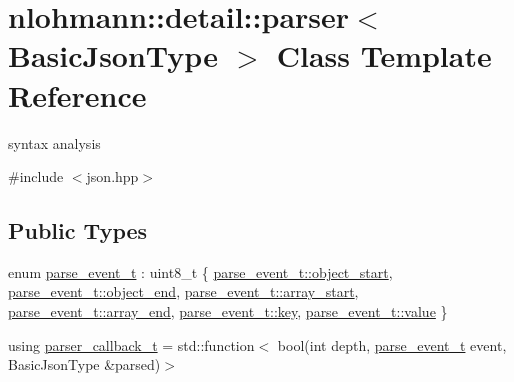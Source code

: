 \hypertarget{classnlohmann_1_1detail_1_1parser}{}\section{nlohmann\+::detail\+::parser$<$ Basic\+Json\+Type $>$ Class Template Reference}
\label{classnlohmann_1_1detail_1_1parser}


syntax analysis  




{\ttfamily \#include $<$json.\+hpp$>$}

\subsection*{Public Types}
\begin{DoxyCompactItemize}
\item 
enum \mbox{\hyperlink{classnlohmann_1_1detail_1_1parser_a37ac88c864dda495f72cb62776b0bebe}{parse\+\_\+event\+\_\+t}} \+: uint8\+\_\+t \{ \newline
\mbox{\hyperlink{classnlohmann_1_1detail_1_1parser_a37ac88c864dda495f72cb62776b0bebeae73f17027cb0acbb537f29d0a6944b26}{parse\+\_\+event\+\_\+t\+::object\+\_\+start}}, 
\mbox{\hyperlink{classnlohmann_1_1detail_1_1parser_a37ac88c864dda495f72cb62776b0bebeaf63e2a2468a37aa4f394fcc3bcb8249c}{parse\+\_\+event\+\_\+t\+::object\+\_\+end}}, 
\mbox{\hyperlink{classnlohmann_1_1detail_1_1parser_a37ac88c864dda495f72cb62776b0bebeaa4388a3d92419edbb1c6efd4d52461f3}{parse\+\_\+event\+\_\+t\+::array\+\_\+start}}, 
\mbox{\hyperlink{classnlohmann_1_1detail_1_1parser_a37ac88c864dda495f72cb62776b0bebea49642fb732aa2e112188fba1f9d3ef7f}{parse\+\_\+event\+\_\+t\+::array\+\_\+end}}, 
\newline
\mbox{\hyperlink{classnlohmann_1_1detail_1_1parser_a37ac88c864dda495f72cb62776b0bebea3c6e0b8a9c15224a8228b9a98ca1531d}{parse\+\_\+event\+\_\+t\+::key}}, 
\mbox{\hyperlink{classnlohmann_1_1detail_1_1parser_a37ac88c864dda495f72cb62776b0bebea2063c1608d6e0baf80249c42e2be5804}{parse\+\_\+event\+\_\+t\+::value}}
 \}
\item 
using \mbox{\hyperlink{classnlohmann_1_1detail_1_1parser_ad250ad4f2b4af4a497e727c963162ff1}{parser\+\_\+callback\+\_\+t}} = std\+::function$<$ bool(int depth, \mbox{\hyperlink{classnlohmann_1_1detail_1_1parser_a37ac88c864dda495f72cb62776b0bebe}{parse\+\_\+event\+\_\+t}} event, Basic\+Json\+Type \&parsed)$>$
\end{DoxyCompactItemize}
